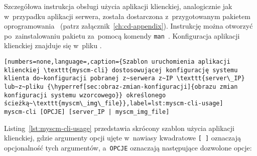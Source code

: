 \documentclass[thesis]{subfiles}
\begin{document}
Szczegółowa instrukcja obsługi użycia aplikacji klienckiej, analogicznie jak w~przypadku aplikacji serwera, została dostarczona z~przygotowanym pakietem oprogramowania \texttt{\cliappname}~(patrz załącznik~\ref{ch:cd-appendix}). Instrukcję można otworzyć po~zainstalowaniu pakietu \texttt{\cliappname} za~pomocą komendy \texttt{man~\cliappname}. Konfiguracja aplikacji klienckiej znajduje się w~pliku \myscmcliconfig.

\begin{lstlisting}[numbers=none,language=,caption={Szablon uruchomienia aplikacji klienckiej \texttt{myscm-cli} dostosowującej konfigurację systemu klienta do~konfiguracji pobranej z~serwera z~IP \texttt{server\_IP} lub~z~pliku {\hyperref[sec:obraz-zmian-konfiguracji]{obrazu zmian konfiguracji systemu wzorcowego}} określonego ścieżką~\texttt{myscm\_img\_file}},label=lst:myscm-cli-usage]
myscm-cli [OPCJE] [server_IP | myscm_img_file]
\end{lstlisting}

Listing~\ref{lst:myscm-cli-usage} przedstawia skrócony szablon użycia aplikacji klienckiej, gdzie argumenty opcji ujęte w~nawiasy kwadratowe \texttt{[~]} oznaczają opcjonalność tych argumentów, a~\texttt{OPCJE} oznaczają następujące dozwolone opcje:\mynobreakpar
\end{document}

